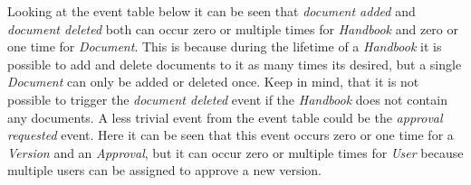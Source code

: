 Looking at the event table below it can be seen that \textit{document added} and \textit{document deleted} both can occur zero or multiple times for \textit{Handbook} and zero or one time for \textit{Document}.
This is because during the lifetime of a \textit{Handbook} it is possible to add and delete documents to it as many times its desired, but a single \textit{Document} can only be added or deleted once.
Keep in mind, that it is not possible to trigger the \textit{document deleted} event if the \textit{Handbook} does not contain any documents.
A less trivial event from the event table could be the \textit{approval requested} event.
Here it can be seen that this event occurs zero or one time for a \textit{Version} and an \textit{Approval}, but it can occur zero or multiple times for \textit{User} because multiple users can be assigned to approve a new version.

